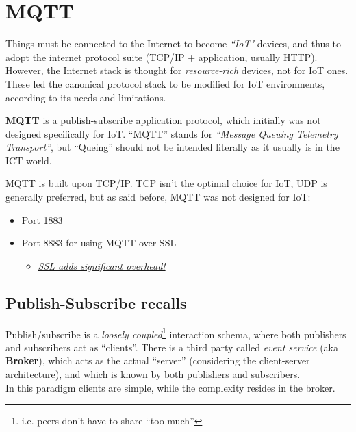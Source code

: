 \chapter{MQTT}
Things must be connected to the Internet to become
\textit{``IoT"} devices, and thus to adopt the internet
protocol suite (TCP/IP + application, usually HTTP).
However, the Internet stack is thought for \textit{resource-rich} devices, not for IoT ones.\\
These led the canonical protocol stack to be modified for IoT environments, according to its needs and limitations.

\textbf{MQTT} is a publish-subscribe application protocol, which initially was not designed specifically for IoT.
``MQTT'' stands for \textit{``Message Queuing
Telemetry Transport''}, but ``Queing'' should not be intended literally as it usually is in the ICT world.
{MQTT is built upon TCP/IP. TCP isn't the optimal choice for IoT, UDP is generally preferred, but as said before, MQTT was not designed for IoT:
\ns
\begin{itemize}
   \item Port 1883
   \item Port 8883 for using MQTT over SSL
   \begin{itemize}
      \item \ul{\textit{SSL adds significant overhead!}}
   \end{itemize}
\end{itemize}
}


\section{Publish-Subscribe recalls}
Publish/subscribe is a \textit{loosely coupled}\footnote{i.e. peers don't have to share ``too much''} interaction schema, where both publishers and subscribers act as ``clients''.
There is a third party called \textit{event service} (aka \textbf{Broker}), which acts as the actual ``server'' (considering the client-server architecture), and which is known by both publishers and subscribers.\\
In this paradigm clients are simple, while the complexity resides in the broker.

